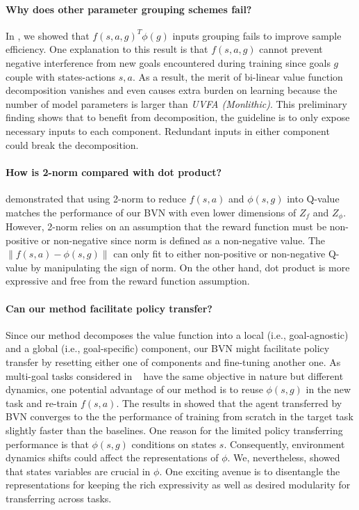 \documentclass[dvipsnames]{article} %
\theoremstyle{definition}
\theoremstyle{remark}
\newcommand{\mono}{\textit{UVFA (Monlithic)}\xspace}
\begin{document}
\paragraph{Why does other parameter grouping schemes fail?} In , we showed that $f(s,a,g)^T\phi(g)$ inputs grouping fails to improve sample efficiency. One explanation to this result is that $f(s,a,g)$ cannot prevent negative interference from new goals encountered during training since goals $g$ couple with states-actions $s,a$. As a result, the merit of bi-linear value function decomposition vanishes and even causes extra burden on learning because the number of model parameters is larger than \mono. This preliminary finding shows that to benefit from decomposition, the guideline is to only expose necessary inputs to each component. Redundant inputs in either component could break the decomposition.

\paragraph{How is 2-norm compared with dot product?}
 demonstrated that using 2-norm to reduce $f(s,a)$ and $\phi(s,g)$ into Q-value matches the performance of our BVN with even lower dimensions of $Z_f$ and $Z_\phi$. However, 2-norm relies on an assumption that the reward function must be non-positive or non-negative since norm is defined as a non-negative value. The $\lVert f(s,a) - \phi(s,g) \rVert$ can only fit to either non-positive or non-negative Q-value by manipulating the sign of norm. On the other hand, dot product is more expressive and free from the reward function assumption.

\paragraph{Can our method facilitate policy transfer?}
Since our method decomposes the value function into a local (i.e., goal-agnostic) and a global (i.e., goal-specific) component, our BVN might facilitate policy transfer by resetting either one of components and fine-tuning another one. As multi-goal tasks considered in ~\citep{plappert2018multi} have the same objective in nature but different dynamics, one potential advantage of our method is to reuse $\phi(s,g)$ in the new task and re-train $f(s,a)$. The results in  showed that the agent transferred by BVN converges to the the performance of training from scratch in the target task slightly faster than the baselines. One reason for the limited policy transferring performance is that $\phi(s,g)$ conditions on states $s$. Consequently, environment dynamics shifts could affect the representations of $\phi$. We, nevertheless, showed that states variables are crucial in $\phi$. One exciting avenue is to disentangle the representations for keeping the rich expressivity as well as desired modularity for transferring across tasks.
\end{document}
